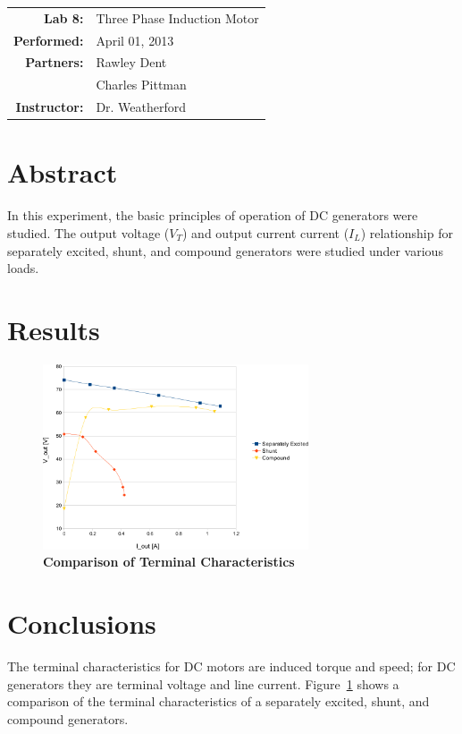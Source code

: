 \documentclass{article}
\begin{document}
\begin{tabular}{rl}
  \textbf{Lab 8:} & Three Phase Induction Motor\\
  \textbf{Performed:} & April 01, 2013 \\
  \textbf{Partners:} & Rawley Dent \\ & Charles Pittman \\
  \textbf{Instructor:} & Dr. Weatherford
\end{tabular}


\section*{Abstract}

In this experiment, the basic principles of operation of DC generators were
studied. The output voltage ($V_T$) and output current current ($I_L$)
relationship for separately excited, shunt, and compound generators were
studied under various loads.

\section*{Results}

\begin{figure}[H]
  \centering
    \includegraphics[width=0.7\textwidth]{img/graph}
    \caption{\textbf{Comparison of Terminal Characteristics}}
    \label{fig:graph}
\end{figure}

\section*{Conclusions}

The terminal characteristics for DC motors are induced torque and speed; for DC
generators they are terminal voltage and line current.  Figure~\ref{fig:graph}
shows a comparison of the terminal characteristics of a separately excited,
shunt, and compound generators.
\end{document}
